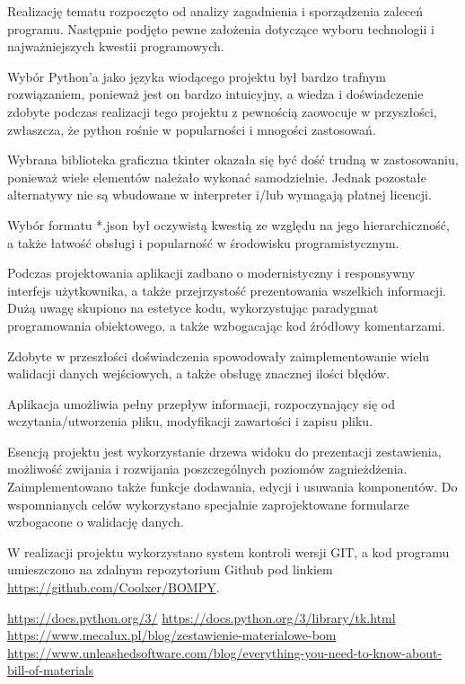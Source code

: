 \documentclass[12pt,twoside]{article}
\begin{document}
Realizację tematu rozpoczęto od analizy zagadnienia i sporządzenia zaleceń programu. Następnie podjęto pewne założenia dotyczące wyboru technologii i najważniejszych kwestii programowych. 

Wybór Python'a jako języka wiodącego projektu był bardzo trafnym rozwiązaniem, ponieważ jest on bardzo intuicyjny, a wiedza i doświadczenie zdobyte podczas realizacji tego projektu z pewnością zaowocuje w przyszłości, zwłaszcza, że python rośnie w popularności i mnogości zastosowań.

Wybrana biblioteka graficzna tkinter okazała się być dość trudną w zastosowaniu, ponieważ wiele elementów należało wykonać samodzielnie. Jednak pozostałe alternatywy nie są wbudowane w interpreter i/lub wymagają płatnej licencji.

Wybór formatu *.json był oczywistą kwestią ze względu na jego hierarchiczność, a także łatwość obsługi i popularność w środowisku programistycznym.

Podczas projektowania aplikacji zadbano o modernistyczny i responsywny interfejs użytkownika, a także przejrzystość prezentowania wszelkich informacji. Dużą uwagę skupiono na estetyce kodu, wykorzystując paradygmat programowania obiektowego, a także wzbogacając kod źródłowy komentarzami.

Zdobyte w przeszłości doświadczenia spowodowały zaimplementowanie wielu walidacji danych wejściowych, a także obsługę znacznej ilości błędów.

Aplikacja umożliwia pełny przepływ informacji, rozpoczynający się od wczytania/utworzenia pliku, modyfikacji zawartości i zapisu pliku.

Esencją projektu jest wykorzystanie drzewa widoku do prezentacji zestawienia, możliwość zwijania i rozwijania poszczególnych poziomów zagnieżdżenia. Zaimplementowano także funkcje dodawania, edycji i usuwania komponentów. Do wspomnianych celów wykorzystano specjalnie zaprojektowane formularze wzbogacone o walidację danych.

W realizacji projektu wykorzystano system kontroli wersji GIT, a kod programu umieszczono na zdalnym repozytorium Github pod linkiem \url{https://github.com/Coolxer/BOMPY}.

\clearpage

\begin{thebibliography}{5}
 \url{https://docs.python.org/3/}
 \url{https://docs.python.org/3/library/tk.html}
 \url{https://www.mecalux.pl/blog/zestawienie-materialowe-bom}
 \url{https://www.unleashedsoftware.com/blog/everything-you-need-to-know-about-bill-of-materials}
\end{thebibliography}

\clearpage
\end{document}
